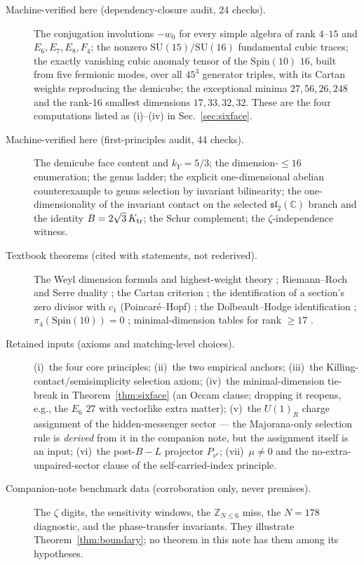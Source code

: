 \documentclass[
  aps,
  prd,
  preprint,
  nofootinbib,
  superscriptaddress,
  longbibliography
]{revtex4-2}
\newcommand{\Spin}{\mathrm{Spin}}
\newcommand{\SU}{\mathrm{SU}}
\newcommand{\sltwo}{\mathfrak{sl}_2(\mathbb C)}
\begin{document}
\begin{description}
\item[Machine-verified here (dependency-closure audit, 24 checks).]
The conjugation involutions \(-w_0\) for every simple algebra of rank
\(4\)--\(15\) and \(E_6,E_7,E_8,F_4\); the nonzero \(\SU(15)/\SU(16)\)
fundamental cubic traces; the exactly vanishing cubic anomaly tensor of the
\(\Spin(10)\) \(16\), built from five fermionic modes, over all \(45^3\)
generator triples, with its Cartan weights reproducing the demicube; the
exceptional minima \(27,56,26,248\) and the rank-16 smallest dimensions
\(17,33,32,32\).  These are the four computations listed as (i)--(iv) in
Sec.~\ref{sec:sixface}.
\item[Machine-verified here (first-principles audit, 44 checks).]
The demicube face content and \(k_Y=5/3\); the dimension-\(\le16\)
enumeration; the genus ladder; the explicit one-dimensional abelian
counterexample to genus selection by invariant bilinearity; the
one-dimensionality of the invariant contact on the selected
\(\sltwo\) branch and the identity \(B=2\sqrt3\,K_{\rm tr}\); the Schur
complement; the \(\zeta\)-independence witness.
\item[Textbook theorems (cited with statements, not rederived).]
The Weyl dimension formula and highest-weight theory
\cite{FultonHarris1991}; Riemann--Roch and Serre duality
\cite{GriffithsHarris1978}; the Cartan criterion \cite{FultonHarris1991};
the identification of a section's zero divisor with \(c_1\)
(Poincar\'e--Hopf) \cite{GriffithsHarris1978}; the Dolbeault--Hodge
identification \cite{LawsonMichelsohn1989}; \(\pi_4(\Spin(10))=0\)
\cite{WittenSU2Anomaly1982}; minimal-dimension tables for rank
\(\ge17\) \cite{Slansky1981}.
\item[Retained inputs (axioms and matching-level choices).]
(i)~the four core principles; (ii)~the two empirical anchors;
(iii)~the Killing-contact/semisimplicity selection axiom;
(iv)~the
minimal-dimension tie-break in Theorem~\ref{thm:sixface} (an Occam clause;
dropping it reopens, e.g., the \(E_6\) \(27\) with vectorlike extra
matter); (v)~the \(U(1)_R\) charge assignment of the hidden-messenger
sector --- the Majorana-only selection rule is \emph{derived} from it in
the companion note, but the assignment itself is an input; (vi)~the
post-\(B\!-\!L\) projector \(P_{\nu^c}\); (vii)~\(\mu\ne0\) and the
no-extra-unpaired-sector clause of the self-carried-index principle.
\item[Companion-note benchmark data (corroboration only, never premises).]
The \(\zeta\) digits, the sensitivity windows, the \(\mathbb Z_{N\le6}\)
miss, the \(N=178\) diagnostic, and the phase-transfer invariants.  They
illustrate Theorem~\ref{thm:boundary}; no theorem in this note has them
among its hypotheses.
\end{description}
\end{document}
